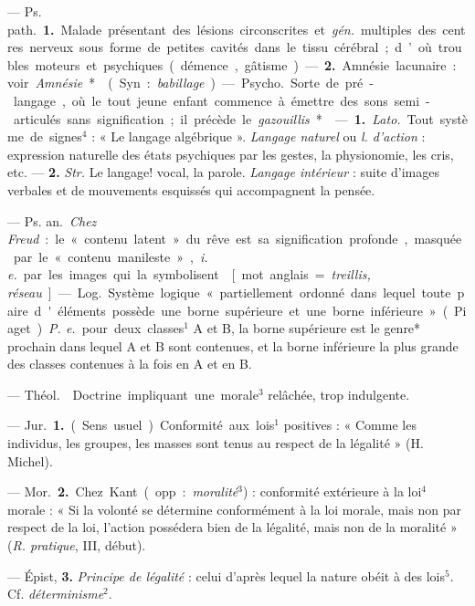 
	\begin{itemize}[leftmargin=1cm, label=, itemsep=1pt]

 — \si{Ps. path.} {\bf 1.} Malade présentant des lésions
circonscrites et {\it gén.} multiples des centres nerveux sous forme de
petites cavités dans le tissu cérébral ; d’où troubles moteurs et psychiques
(démence, gâtisme). — {\bf 2.} Amnésie lacunaire : voir {\it Amnésie}*.

 (Syn. : {\it babillage}). — \si{Psycho.} Sorte de pré-langage,
où le tout jeune enfant commence à émettre des sons semi-articulés sans
signification ; il précède le {\it gazouillis}*.

 — {\bf 1.} {\it Lato.} Tout système de signes$^4$ : « Le langage
algébrique ». {\it Langage naturel} ou {\it l. d'action} : expression
naturelle des états psychiques par les gestes, la physionomie, les cris, etc.
— {\bf 2.} {\it Str.} Le langage! vocal, la parole. {\it Langage intérieur} :
suite d'images verbales et de mouvements esquissés qui accompagnent la pensée.

 — \si{Ps. an.} {\it Chez Freud} : le « contenu latent » du rêve
est sa signification profonde, masquée par le « contenu manileste », {\it i.
e.} par les images qui la symbolisent.

 [mot anglais = {\it treillis, réseau}] — \si{Log.} Système
logique « partiellement ordonné dans lequel toute paire d'éléments possède
une borne supérieure et une borne inférieure » (Piaget). {\it P. e.} pour
deux classes$^1$ A et B, la borne supérieure est le genre* prochain dans
lequel A et B
sont contenues, et la borne inférieure la plus grande des classes contenues à
la fois en A et en B.

 — \si{Théol.}  Doctrine impliquant une morale$^3$
relâchée, trop indulgente.

 — \si{Jur.} {\bf 1.} (Sens usuel). Conformité aux lois$^1$
positives : « Comme les individus, les groupes, les masses sont tenus au
respect de la légalité » (H. Michel).

— \si{Mor.} {\bf 2.} Chez Kant (opp. : {\it moralité}$^3$) : conformité
extérieure à la loi$^4$ morale : « Si la volonté se détermine conformément à
la loi morale, mais non par respect de la loi, l’action possédera bien de la
légalité, mais non de la moralité » ({\it R. pratique}, III, début).

— Épist, {\bf 3.} {\it Principe de légalité} : celui d’après lequel la nature
obéit à des lois$^5$. Cf. {\it déterminisme}$^2$.


\end{itemize}
